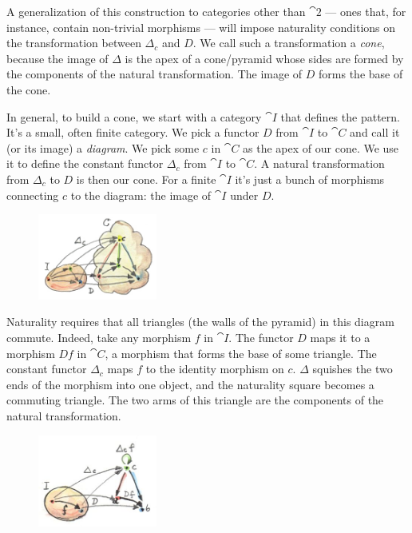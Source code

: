 \noindent
A generalization of this construction to categories other than
$\cat{2}$ --- ones that, for instance, contain non-trivial morphisms
--- will impose naturality conditions on the transformation between
$\Delta_c$ and $D$. We call such a transformation a \emph{cone},
because the image of $\Delta$ is the apex of a cone/pyramid whose sides are
formed by the components of the natural transformation. The image of $D$
forms the base of the cone.

In general, to build a cone, we start with a category $\cat{I}$ that
defines the pattern. It's a small, often finite category. We pick a
functor $D$ from $\cat{I}$ to $\cat{C}$ and call it (or its image) a
\emph{diagram}. We pick some $c$ in $\cat{C}$ as the apex of our
cone. We use it to define the constant functor $\Delta_c$ from
$\cat{I}$ to $\cat{C}$. A natural transformation from $\Delta_c$
to $D$ is then our cone. For a finite $\cat{I}$ it's just a bunch of
morphisms connecting $c$ to the diagram: the image of $\cat{I}$
under $D$.

\begin{figure}[H]
\centering
\includegraphics[width=0.35\textwidth]{images/cone.jpg}
\end{figure}

\noindent
Naturality requires that all triangles (the walls of the pyramid) in
this diagram commute. Indeed, take any morphism $f$ in $\cat{I}$.
The functor $D$ maps it to a morphism $D f$ in $\cat{C}$, a
morphism that forms the base of some triangle. The constant functor
$\Delta_c$ maps $f$ to the identity morphism on
$c$. $\Delta$ squishes the two ends of the morphism into one object, and
the naturality square becomes a commuting triangle. The two arms of this
triangle are the components of the natural transformation.

\begin{figure}[H]
\centering
\includegraphics[width=0.35\textwidth]{images/conenaturality.jpg}
\end{figure}


